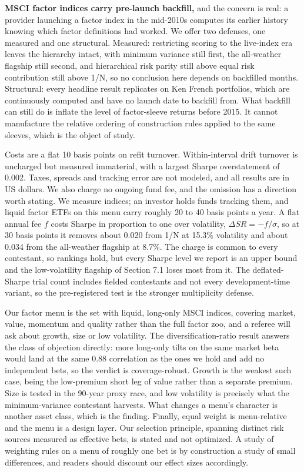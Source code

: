 \documentclass[12pt,letterpaper]{article}
\newcommand{\head}[1]{\noindent\textbf{#1}\hspace{0.5em}\ignorespaces}
\begin{document}
\head{MSCI factor indices carry pre-launch backfill,} and the concern is real: a
provider launching a factor index in the mid-2010s computes its earlier history
knowing which factor definitions had worked. We offer two defenses, one measured
and one structural. Measured: restricting scoring to the live-index era leaves the
hierarchy intact, with minimum variance still first, the all-weather flagship
still second, and hierarchical risk parity still above equal risk contribution
still above 1/N, so no conclusion here depends on backfilled months. Structural:
every headline result replicates on Ken French portfolios, which are continuously
computed and have no launch date to backfill from. What backfill can still do is
inflate the level of factor-sleeve returns before 2015. It cannot manufacture the
relative ordering of construction rules applied to the same sleeves, which is the
object of study.

Costs are a flat 10 basis points on refit turnover. Within-interval drift turnover
is uncharged but measured immaterial, with a largest Sharpe overstatement of
0.002. Taxes, spreads and tracking error are not modeled, and all results are in
US dollars. We also charge no ongoing fund fee, and the omission has a direction worth stating. We measure indices; an investor holds funds tracking
them, and liquid factor ETFs on this menu carry roughly 20 to 40 basis points a
year. A flat annual fee $f$ costs Sharpe in proportion to one over volatility,
$\Delta SR = -f/\sigma$, so at 30 basis points it removes about 0.020 from 1/N at 15.3\%
volatility and about 0.034 from the all-weather flagship at 8.7\%. The charge is common to every
contestant, so rankings hold, but every Sharpe level we report is an upper bound
and the low-volatility flagship of Section 7.1 loses most from it. The
deflated-Sharpe trial count includes fielded contestants and not every
development-time variant, so the pre-registered test is the stronger multiplicity
defense.

Our factor menu is the set with liquid, long-only MSCI indices, covering market,
value, momentum and quality rather than the full factor zoo, and a referee will
ask about growth, size or low volatility. The diversification-ratio result answers
the class of objection directly: more long-only tilts on the same market beta
would land at the same 0.88 correlation as the ones we hold and add no independent
bets, so the verdict is coverage-robust. Growth is the weakest such case, being
the low-premium short leg of value rather than a separate premium. Size is tested
in the 90-year proxy race, and low volatility is precisely what the
minimum-variance contestant harvests. What changes a menu's character is another
asset class, which is the finding. Finally, equal weight is menu-relative and the
menu is a design layer. Our selection principle, spanning distinct risk sources
measured as effective bets, is stated and not optimized. A study of weighting
rules on a menu of roughly one bet is by construction a study of small
differences, and readers should discount our effect sizes accordingly.
\end{document}
